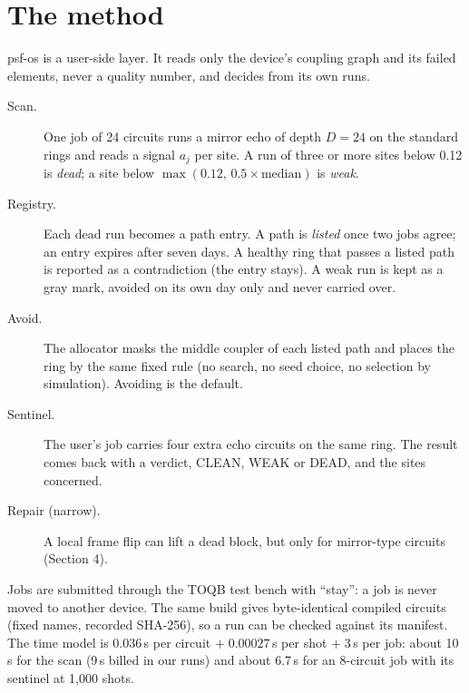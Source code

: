 \documentclass[10pt,a4paper]{article}
\begin{document}
\section{The method}

psf-os is a user-side layer. It reads only the device's coupling graph and its failed elements, never a quality
number, and decides from its own runs.

\begin{description}
\item[Scan.] One job of 24 circuits runs a mirror echo of depth $D=24$ on the standard rings and reads a signal $a_j$
  per site. A run of three or more sites below 0.12 is \emph{dead}; a site below $\max(0.12,\,0.5\times\text{median})$
  is \emph{weak}.
\item[Registry.] Each dead run becomes a path entry. A path is \emph{listed} once two jobs agree; an entry expires
  after seven days. A healthy ring that passes a listed path is reported as a contradiction (the entry stays). A weak
  run is kept as a gray mark, avoided on its own day only and never carried over.
\item[Avoid.] The allocator masks the middle coupler of each listed path and places the ring by the same fixed rule
  (no search, no seed choice, no selection by simulation). Avoiding is the default.
\item[Sentinel.] The user's job carries four extra echo circuits on the same ring. The result comes back with a
  verdict, CLEAN, WEAK or DEAD, and the sites concerned.
\item[Repair (narrow).] A local frame flip can lift a dead block, but only for mirror-type circuits (Section 4).
\end{description}

Jobs are submitted through the TOQB test bench with ``stay'': a job is never moved to another device. The same build
gives byte-identical compiled circuits (fixed names, recorded SHA-256), so a run can be checked against its manifest.
The time model is $0.036$\,s per circuit $+\;0.00027$\,s per shot $+\;3$\,s per job: about 10\,s for the scan
(9\,s billed in our runs) and about 6.7\,s for an 8-circuit job with its sentinel at 1,000 shots.
\end{document}
